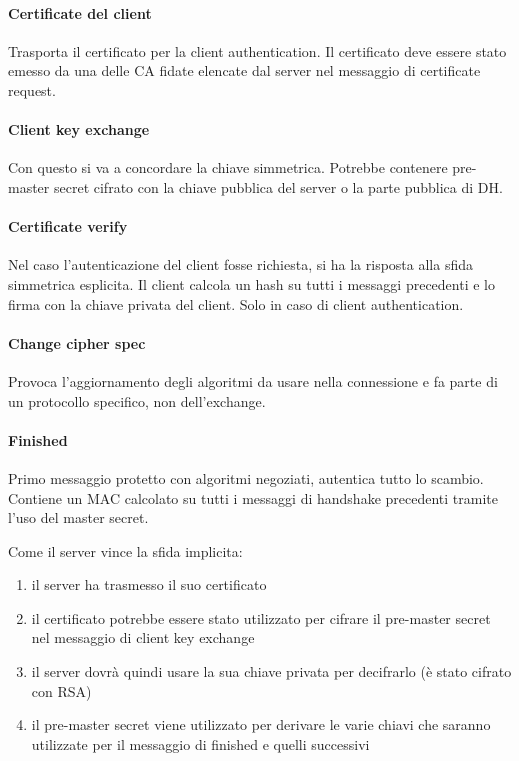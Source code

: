 \documentclass[11pt]{article}
\begin{document}
\paragraph*{Certificate del client}
Trasporta il certificato per la client authentication. Il certificato deve essere stato emesso da una delle CA fidate elencate 
dal server nel messaggio di certificate request.
\paragraph*{Client key exchange}
Con questo si va a concordare la chiave simmetrica. Potrebbe contenere pre-master secret cifrato con la chiave pubblica 
del server o la parte pubblica di DH.
\paragraph*{Certificate verify}
Nel caso l'autenticazione del client fosse richiesta, si ha la risposta alla sfida simmetrica esplicita. Il client calcola 
un hash su tutti i messaggi precedenti e lo firma con la chiave privata del client. Solo in caso di client authentication.
\paragraph*{Change cipher spec}
Provoca l'aggiornamento degli algoritmi da usare nella connessione e fa parte di un protocollo specifico, non dell'exchange.
\paragraph*{Finished}
Primo messaggio protetto con algoritmi negoziati, autentica tutto lo scambio. Contiene un MAC calcolato su tutti i messaggi 
di handshake precedenti tramite l'uso del master secret. 

Come il server vince la sfida implicita:
\begin{enumerate}
    \item il server ha trasmesso il suo certificato 
    \item il certificato potrebbe essere stato utilizzato per cifrare il pre-master secret nel messaggio di client key exchange 
    \item il server dovrà quindi usare la sua chiave privata per decifrarlo (è stato cifrato con RSA)
    \item il pre-master secret viene utilizzato per derivare le varie chiavi che saranno utilizzate per il messaggio di finished
    e quelli successivi
\end{enumerate}
\end{document}
